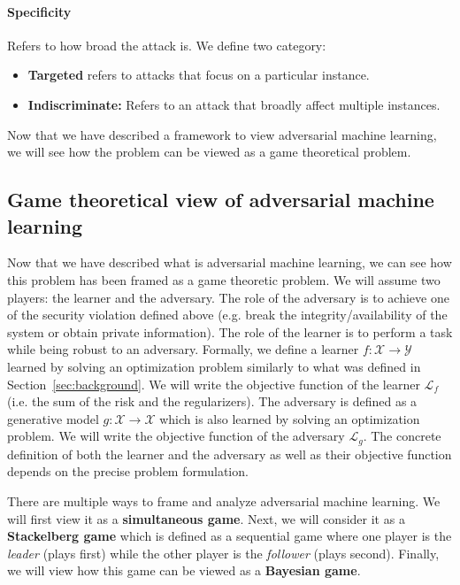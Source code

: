 \paragraph{Specificity} Refers to how broad the attack is. We define two category:
\begin{itemize}
    \item \textbf{Targeted} refers to attacks that focus on a particular instance.
    \item \textbf{Indiscriminate:} Refers to an attack that broadly affect multiple instances.
\end{itemize}

Now that we have described a framework to view adversarial machine learning, we will see how the problem can be viewed as a game theoretical problem.

\subsection{Game theoretical view of adversarial machine learning}

Now that we have described what is adversarial machine learning, we can see how this problem has been framed as a game theoretic problem. We will assume two players: the learner and the adversary. The role of the adversary is to achieve one of the security violation defined above (e.g. break the integrity/availability of the system or obtain private information). The role of the learner is to perform a task while being robust to an adversary. Formally, we define a learner $f:\mathcal X\to \mathcal Y$ learned by solving an optimization problem similarly to what was defined in Section~\ref{sec:background}. We will write the objective function of the learner $\mathcal{L}_f$ (i.e. the sum of the risk and the regularizers). The adversary is defined as a generative model $g:\mathcal X\to \mathcal X$ which is also learned by solving an optimization problem. We will write the objective function of the adversary $\mathcal{L}_g$. The concrete definition of both the learner and the adversary as well as their objective function depends on the precise problem formulation. 

There are multiple ways to frame and analyze adversarial machine learning. We will first view it as a \textbf{simultaneous game}. Next, we will consider it as a \textbf{Stackelberg game} which is defined as a sequential game where one player is the \textit{leader} (plays first) while the other player is the \textit{follower} (plays second). Finally, we will view how this game can be viewed as a \textbf{Bayesian game}.
